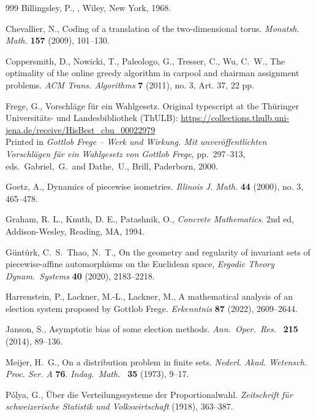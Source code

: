 \documentclass[11pt,reqno,tbtags,a4paper]{amsart}
\numberwithin{equation}{section}
\theoremstyle{plain}%
\theoremstyle{definition}
\theoremstyle{remark}
\newcommand\etal{{et al\xperiod}}
\newcommand\0{{\boldsymbol 0}}
\newcommand\1{{\boldsymbol 1}}
\begin{document}
\begin{thebibliography}{999}
Billingsley, P.,
,
Wiley, New York, 1968.

Chevallier, N.,
Coding of a translation of the two-dimensional torus.
\emph{Monatsh. Math.} \textbf{157} (2009), 101--130.

\bibitem[Coppersmith \etal(2011)]{Coppersmith}
%
%
Coppersmith, D., Nowicki, T., Paleologo, G.,  Tresser, C., Wu, C.~W., 
The optimality of the online greedy algorithm in carpool and chairman
assignment problems.
\emph{ACM Trans. Algorithms} \textbf{7} (2011), no. 3, Art. 37, 22 pp.

Frege, G., 
Vorschl\"age f\"ur ein Wahlgesetz. Original typescript at the
Th\"uringer Universit\"ats- und Landesbibliothek (ThULB):
\url{https://collections.thulb.uni-jena.de/receive/HisBest_cbu_00022979}
\\
Printed in 
\emph{Gottlob Frege -- Werk und Wirkung.
Mit unveröffentlichten Vorschlägen für ein Wahlgesetz von Gottlob Frege},
pp.\ 297--313, eds.\ Gabriel,~G.\ and Dathe,~U., Brill, Paderborn, 2000.

Goetz, A.,
Dynamics of piecewise isometries.
\emph{Illinois J. Math.} \textbf{44} (2000), no. 3, 465--478.


Graham, R. L., Knuth, D. E., Patashnik, O.,
\emph{Concrete Mathematics}.
2nd ed, Addison-Wesley,  Reading, MA, 1994.


G\"unt\"urk, C.\ S.\, Thao, N.\ T., On the geometry and regularity of invariant 
sets of piecewise-affine automorphisms on the Euclidean space,
\emph{Ergodic Theory  Dynam.\ Systems} 
{\bf 40} (2020), 2183--2218. 

Harrenstein, P., Lackner, M.-L., Lackner, M.,
A mathematical analysis of an election system proposed by Gottlob Frege.
\emph{Erkenntnis} \textbf{87} (2022), 2609--2644.

Janson, S.,
Asymptotic bias of some election methods.
\emph{Ann.\ Oper.\ Res.\ } \textbf{215} (2014), 89--136.

Meijer, H.\ G.,
On a distribution problem in finite sets.
\emph{Nederl. Akad. Wetensch. Proc. Ser. A} \textbf{76}.
\emph{Indag.\ Math.\ } \textbf{35} (1973), 9--17.

Pólya, G.,
Über die Verteilungssysteme der Proportionalwahl. 
\emph{Zeitschrift für schweizerische Statistik und Volkswirtschaft} 
 (1918), 363--387.


\end{thebibliography}
\end{document}

